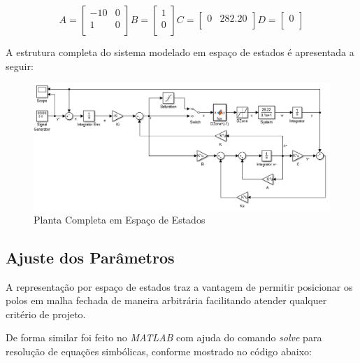 \documentclass[a4paper,11pt]{article}
\begin{document}
\begin{equation}
A = \left[\begin{array}{cc}
    -10 & 0 \\
    1 & 0   \\
\end{array}\right]
B = \left[\begin{array}{c}
    1 \\
    0 \\
\end{array}
\right]
C = \left[\begin{array}{cc}
    0 & 282.20\\
\end{array}
\right]
D = \left[\begin{array}{c}
    0 \\
\end{array}
\right]
\end{equation}

A estrutura completa do sistema modelado em espaço de estados é apresentada a seguir:

\begin{figure}[H]
    \centering
    \includegraphics[width=0.8\linewidth]{tex/img/Planta_Espaco_de_Estados.png}
    \caption{Planta Completa em Espaço de Estados}
    \label{fig:Planta_Espaco_de_Estados_Completa}
\end{figure}

\subsection{Ajuste dos Parâmetros}

A representação por espaço de estados traz a vantagem de permitir posicionar os polos em malha fechada de maneira arbitrária facilitando atender qualquer critério de projeto.

De forma similar foi feito no \textit{MATLAB} com ajuda do comando \textit{solve} para resolução de equações simbólicas, conforme mostrado no código abaixo:

\inputminted[frame=single,framesep=10pt]{matlab}{../src/matlab/Fase-3/Script_Controle_Espaco_de_Estados.m}
\end{document}
